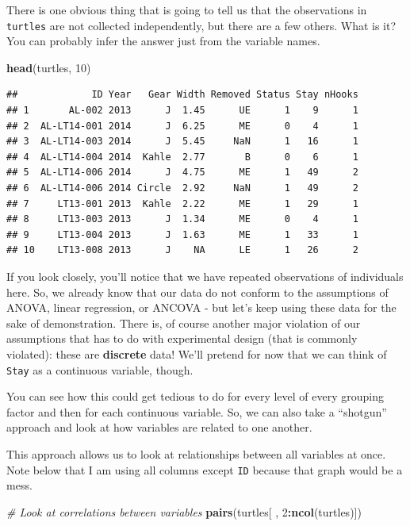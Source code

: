 \documentclass[
]{book}
\newenvironment{Shaded}{\begin{snugshade}}{\end{snugshade}}
\newcommand{\CommentTok}[1]{\textcolor[rgb]{0.56,0.35,0.01}{\textit{#1}}}
\newcommand{\DecValTok}[1]{\textcolor[rgb]{0.00,0.00,0.81}{#1}}
\newcommand{\KeywordTok}[1]{\textcolor[rgb]{0.13,0.29,0.53}{\textbf{#1}}}
\newcommand{\NormalTok}[1]{#1}
\newcommand{\OperatorTok}[1]{\textcolor[rgb]{0.81,0.36,0.00}{\textbf{#1}}}
\begin{document}
There is one obvious thing that is going to tell us that the observations in \texttt{turtles} are not collected independently, but there are a few others. What is it? You can probably infer the answer just from the variable names.

\begin{Shaded}
\begin{Highlighting}[]
\KeywordTok{head}\NormalTok{(turtles, }\DecValTok{10}\NormalTok{)}
\end{Highlighting}
\end{Shaded}

\begin{verbatim}
##             ID Year   Gear Width Removed Status Stay nHooks
## 1       AL-002 2013      J  1.45      UE      1    9      1
## 2  AL-LT14-001 2014      J  6.25      ME      0    4      1
## 3  AL-LT14-003 2014      J  5.45     NaN      1   16      1
## 4  AL-LT14-004 2014  Kahle  2.77       B      0    6      1
## 5  AL-LT14-006 2014      J  4.75      ME      1   49      2
## 6  AL-LT14-006 2014 Circle  2.92     NaN      1   49      2
## 7     LT13-001 2013  Kahle  2.22      ME      1   29      1
## 8     LT13-003 2013      J  1.34      ME      0    4      1
## 9     LT13-004 2013      J  1.63      ME      1   33      1
## 10    LT13-008 2013      J    NA      LE      1   26      2
\end{verbatim}

If you look closely, you'll notice that we have repeated observations of individuals here. So, we already know that our data do not conform to the assumptions of ANOVA, linear regression, or ANCOVA - but let's keep using these data for the sake of demonstration. There is, of course another major violation of our assumptions that has to do with experimental design (that is commonly violated): these are \textbf{discrete} data! We'll pretend for now that we can think of \texttt{Stay} as a continuous variable, though.

You can see how this could get tedious to do for every level of every grouping factor and then for each continuous variable. So, we can also take a ``shotgun'' approach and look at how variables are related to one another.

This approach allows us to look at relationships between all variables at once. Note below that I am using all columns except \texttt{ID} because that graph would be a mess.

\begin{Shaded}
\begin{Highlighting}[]
\CommentTok{# Look at correlations between variables}
\KeywordTok{pairs}\NormalTok{(turtles[ , }\DecValTok{2}\OperatorTok{:}\KeywordTok{ncol}\NormalTok{(turtles)])}
\end{Highlighting}
\end{Shaded}
\end{document}
